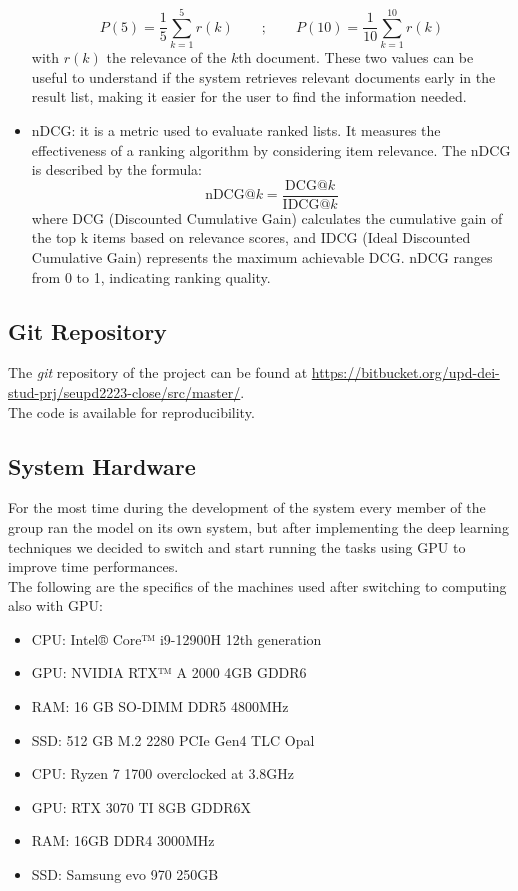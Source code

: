 \begin{itemize}
    \begin{equation*}
        P(5) = \frac{1}{5} \sum_{k=1}^{5}r(k) \qquad ; \qquad P(10) = \frac{1}{10} \sum_{k=1}^{10}r(k)
    \end{equation*}
    with $r(k)$ the relevance of the $k$th document.
    \newline
    These two values can be useful to understand if the system retrieves relevant documents early in the result list, making it easier for the user to find the information needed.
    \item{nDCG}: it is a metric used to evaluate ranked lists. It measures the effectiveness of a ranking algorithm by considering item relevance. The nDCG is described by the formula:
    \begin{equation*}
        \text{nDCG}@k = \frac{\text{DCG}@k}{\text{IDCG}@k} 
    \end{equation*}
    where DCG (Discounted Cumulative Gain) calculates the cumulative gain of the top k items based on relevance scores, and IDCG (Ideal Discounted Cumulative Gain) represents the maximum achievable DCG. nDCG ranges from 0 to 1, indicating ranking quality.

\end{itemize}


\subsection{Git Repository}
The \textit{git} repository of the project can be found at
\url{https://bitbucket.org/upd-dei-stud-prj/seupd2223-close/src/master/}. \\
The code is available for reproducibility.


\subsection{System Hardware}
For the most time during the development of the system every member of the group ran the model on its own system, but after implementing the deep learning techniques we decided to switch and start running the tasks using GPU to improve time performances. \\
The following are the specifics of the machines used after switching to computing also with GPU:
\begin{itemize}
	\item CPU: Intel® Core™ i9-12900H 12th generation
	\item GPU: NVIDIA RTX™ A 2000 4GB GDDR6
	\item RAM: 16 GB SO-DIMM DDR5 4800MHz
	\item SSD: 512 GB M.2 2280 PCIe Gen4 TLC Opal
\end{itemize}
\begin{itemize}
	\item CPU: Ryzen 7 1700 overclocked at 3.8GHz
	\item GPU: RTX 3070 TI 8GB GDDR6X
	\item RAM: 16GB  DDR4 3000MHz
	\item SSD: Samsung evo 970 250GB
\end{itemize}


